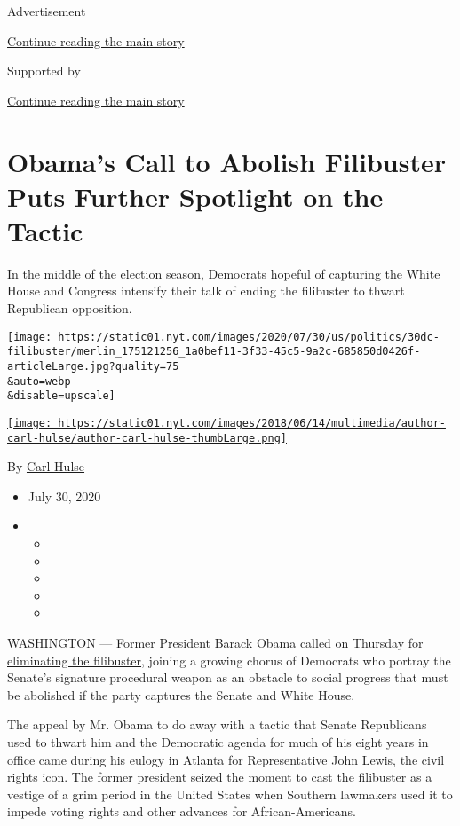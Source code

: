 Advertisement

\protect\hyperlink{after-top}{Continue reading the main story}

Supported by

\protect\hyperlink{after-sponsor}{Continue reading the main story}

\hypertarget{obamas-call-to-abolish-filibuster-puts-further-spotlight-on-the-tactic}{%
\section{Obama's Call to Abolish Filibuster Puts Further Spotlight on
the
Tactic}\label{obamas-call-to-abolish-filibuster-puts-further-spotlight-on-the-tactic}}

In the middle of the election season, Democrats hopeful of capturing the
White House and Congress intensify their talk of ending the filibuster
to thwart Republican opposition.

\texttt{[image: https://static01.nyt.com/images/2020/07/30/us/politics/30dc-filibuster/merlin\_175121256\_1a0bef11-3f33-45c5-9a2c-685850d0426f-articleLarge.jpg?quality=75\\\&auto=webp\\\&disable=upscale]}

\href{https://www.nytimes.com/by/carl-hulse}{\texttt{[image: https://static01.nyt.com/images/2018/06/14/multimedia/author-carl-hulse/author-carl-hulse-thumbLarge.png]}}

By \href{https://www.nytimes.com/by/carl-hulse}{Carl Hulse}

\begin{itemize}
\item
  July 30, 2020
\item
  \begin{itemize}
  \item
  \item
  \item
  \item
  \item
  \end{itemize}
\end{itemize}

WASHINGTON --- Former President Barack Obama called on Thursday for
\href{https://www.nytimes.com/2020/07/30/us/politics/john-lewis-funeral-barack-obama.html}{eliminating
the filibuster}, joining a growing chorus of Democrats who portray the
Senate's signature procedural weapon as an obstacle to social progress
that must be abolished if the party captures the Senate and White House.

The appeal by Mr. Obama to do away with a tactic that Senate Republicans
used to thwart him and the Democratic agenda for much of his eight years
in office came during his eulogy in Atlanta for Representative John
Lewis, the civil rights icon. The former president seized the moment to
cast the filibuster as a vestige of a grim period in the United States
when Southern lawmakers used it to impede voting rights and other
advances for African-Americans.

